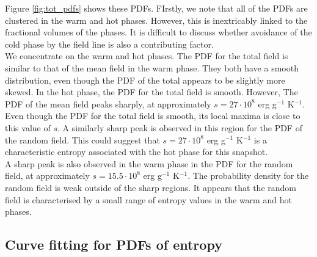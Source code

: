 \documentclass[useAMS,usenatbib]{mn2e}
\begin{document}

Figure \vref{fig:tot_pdfs} shows these PDFs. FIrstly, we note that all of the PDFs are clustered in the warm and hot phases. However, this is inextricably linked to the fractional volumes of the phases. It is difficult to discuss whether avoidance of the cold phase by the field line is also a contributing factor.\\
We concentrate on the warm and hot phases. The PDF for the total field is similar to that of the mean field in the warm phase. They both have a smooth distribution, even though the PDF of the total appears to be slightly more skewed. In the hot phase, the PDF for the total field is smooth. However, The PDF of the mean field peaks sharply, at approximately $s=27\cdot10^8$ erg g$^{-1}$ K$^{-1}$. Even though the PDF for the total field is smooth, its local maxima is close to this value of $s$. A similarly sharp peak is observed in this region for the PDF of the random field. This could suggest that $s=27\cdot10^8$ erg g$^{-1}$ K$^{-1}$ is a characteristic entropy associated with the hot phase for this snapshot. \\
A sharp peak is also observed in the warm phase in the PDF for the random field, at approximately $s=15.5\cdot10^8$ erg g$^{-1}$ K$^{-1}$. The probability density for the random field is weak outside of the sharp regions. It appears that the random field is characterised by a small range of entropy values in the warm and hot phases. 

\subsection{Curve fitting for PDFs of entropy}
\end{document}
